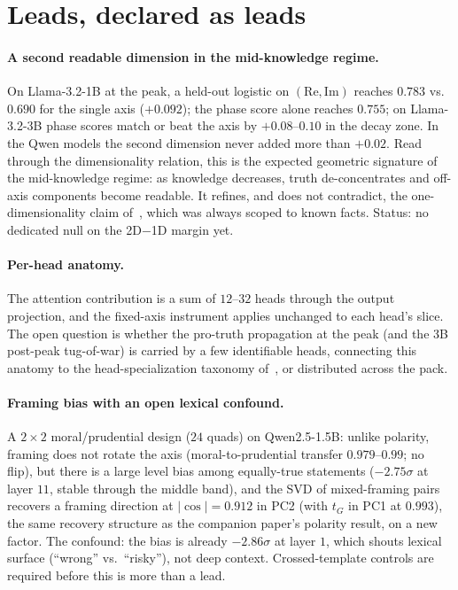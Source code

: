 \documentclass[11pt]{article}
\begin{document}
\section{Leads, declared as leads}
\label{sec:leads}

\paragraph{A second readable dimension in the mid-knowledge regime.} On
Llama-3.2-1B at the peak, a held-out logistic on $(\mathrm{Re},
\mathrm{Im})$ reaches $0.783$ vs.\ $0.690$ for the single axis ($+0.092$);
the phase score alone reaches $0.755$; on Llama-3.2-3B phase scores match or
beat the axis by $+0.08$--$0.10$ in the decay zone. In the Qwen models the
second dimension never added more than $+0.02$. Read through the
dimensionality relation, this is the expected geometric signature of the
mid-knowledge regime: as knowledge decreases, truth de-concentrates and
off-axis components become readable. It refines, and does not contradict,
the one-dimensionality claim of~\cite{companion}, which was always scoped to
known facts. Status: no dedicated null on the 2D$-$1D margin yet.

\paragraph{Per-head anatomy.} The attention contribution is a sum of
$12$--$32$ heads through the output projection, and the fixed-axis
instrument applies unchanged to each head's slice. The open question is
whether the pro-truth propagation at the peak (and the 3B post-peak
tug-of-war) is carried by a few identifiable heads, connecting this anatomy
to the head-specialization taxonomy of~\cite{headgenome}, or distributed
across the pack.

\paragraph{Framing bias with an open lexical confound.} A $2{\times}2$
moral/prudential design ($24$ quads) on Qwen2.5-1.5B: unlike polarity,
framing does not rotate the axis (moral-to-prudential transfer
$0.979$--$0.99$; no flip), but there is a large level bias among
equally-true statements ($-2.75\sigma$ at layer $11$, stable through the
middle band), and the SVD of mixed-framing pairs recovers a framing
direction at $|\cos| = 0.912$ in PC2 (with $t_G$ in PC1 at $0.993$), the
same recovery structure as the companion paper's polarity result, on a new
factor. The confound: the bias is already $-2.86\sigma$ at layer $1$, which
shouts lexical surface (``wrong'' vs.\ ``risky''), not deep context.
Crossed-template controls are required before this is more than a lead.
\end{document}
